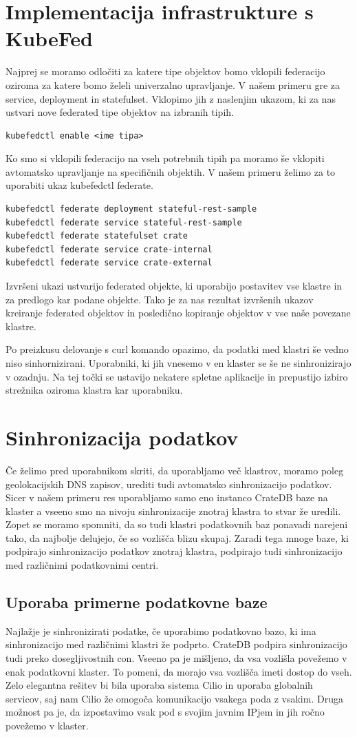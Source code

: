 \documentclass[a4paper, 12pt]{book}
\begin{document}
\section{Implementacija infrastrukture s KubeFed}
Najprej se moramo odločiti za katere tipe objektov bomo vklopili federacijo oziroma za katere bomo želeli univerzalno upravljanje.
V našem primeru gre za service, deployment in statefulset. Vklopimo jih z naslenjim ukazom, ki za nas ustvari nove federated tipe objektov na izbranih tipih.
\begin{verbatim}
kubefedctl enable <ime tipa>
\end{verbatim}
Ko smo si vklopili federacijo na vseh potrebnih tipih pa moramo še vklopiti avtomatsko upravljanje na specifičnih objektih.
V našem primeru želimo za to uporabiti ukaz kubefedctl federate.
\begin{verbatim}
kubefedctl federate deployment stateful-rest-sample
kubefedctl federate service stateful-rest-sample
kubefedctl federate statefulset crate
kubefedctl federate service crate-internal
kubefedctl federate service crate-external
\end{verbatim}
Izvršeni ukazi ustvarijo federated objekte, ki uporabijo postavitev vse klastre in za predlogo kar podane objekte.
Tako je za nas rezultat izvršenih ukazov kreiranje federated objektov in posledično kopiranje objektov v vse naše povezane klastre.

Po preizkusu delovanje s curl komando opazimo, da podatki med klastri še vedno niso sinhornizirani.
Uporabniki, ki jih vnesemo v en klaster se še ne sinhronizirajo v ozadnju.
Na tej točki se ustavijo nekatere spletne aplikacije in prepustijo izbiro strežnika oziroma klastra kar uporabniku.
\section{Sinhronizacija podatkov}
Če želimo pred uporabnikom skriti, da uporabljamo več klastrov, moramo poleg geolokacijskih DNS zapisov, urediti tudi avtomatsko sinhronizacijo podatkov.
Sicer v našem primeru res uporabljamo samo eno instanco CrateDB baze na klaster a vseeno smo na nivoju sinhronizacije znotraj klastra to stvar že uredili. 
Zopet se moramo spomniti, da so tudi klastri podatkovnih baz ponavadi narejeni tako, da najbolje delujejo, če so vozlišča blizu skupaj.
Zaradi tega mnoge baze, ki podpirajo sinhronizacijo podatkov znotraj klastra, podpirajo tudi sinhronizacijo med različnimi podatkovnimi centri.
\subsection{Uporaba primerne podatkovne baze}
Najlažje je sinhronizirati podatke, če uporabimo podatkovno bazo, ki ima sinhronizacijo med različnimi klastri že podprto.
CrateDB podpira sinhronizacijo tudi preko dosegljivostnih con.
Vseeno pa je mišljeno, da vsa vozlišla povežemo v enak podatkovni klaster.
To pomeni, da morajo vsa vozlišča imeti dostop do vseh.
Zelo elegantna rešitev bi bila uporaba sistema Cilio in uporaba globalnih servicov, saj nam Cilio že omogoča komunikacijo vsakega poda z vsakim.
Druga možnost pa je, da izpostavimo vsak pod s svojim javnim IPjem in jih ročno povežemo v klaster.
\end{document}
